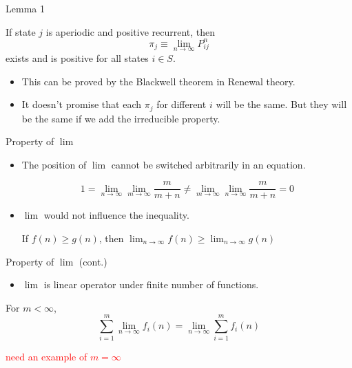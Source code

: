 \documentclass{beamer}
\begin{document}
\begin{frame}{Lemma 1}
	\begin{lemma}
		If state $j$ is aperiodic and positive recurrent, then
		\[
		\pi_j \equiv \lim_{n \to \infty} P^n_{ij}
		\]
		exists and is positive for all states $i \in S$.
	\end{lemma}
	\begin{itemize}
		\item This can be proved by the Blackwell theorem in Renewal theory.
		\item It doesn't promise that each $\pi_j$ for different $i$ will be the same.
			But they will be the same if we add the irreducible property.
	\end{itemize}
\end{frame}

\begin{frame}{Property of $\lim$}
	\begin{itemize}
		\item The position of $\lim$ cannot be switched arbitrarily in an equation.
			\begin{example}
				\[
				1 = \lim_{n \to \infty}\lim_{m \to \infty} \frac{m}{m+n} \neq
				\lim_{m \to \infty}\lim_{n \to \infty} \frac{m}{m+n} = 0
				\]
			\end{example}
		\item $\lim$ would not influence the inequality.
			\begin{example}
				\begin{center}
					If $f(n) \geq g(n)$, then
					$\lim_{n \to \infty} f(n) \geq \lim_{n \to \infty} g(n)$
				\end{center}
			\end{example}
	\end{itemize}
\end{frame}

\begin{frame}{Property of $\lim$ (cont.)}
	\begin{itemize}
		\item $\lim$ is linear operator under finite number of functions.
	\end{itemize}
	\begin{example}
		For $m < \infty$,
		\[
		\sum_{i=1}^m \lim_{n \to \infty} f_i(n) = \lim_{n \to \infty} \sum_{i=1}^m f_i(n)
		\]
	\end{example}
	\textcolor{red}{need an example of $m = \infty$}
\end{frame}
\end{document}
